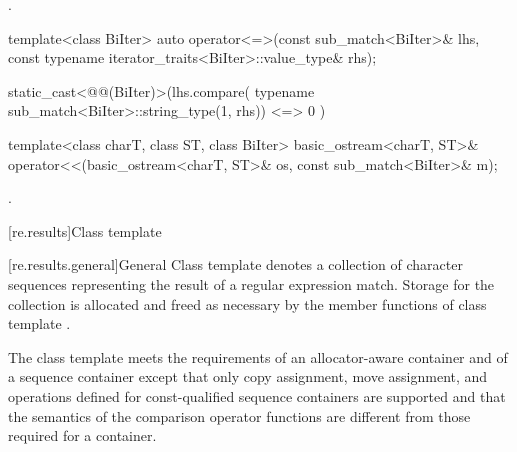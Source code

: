 \begin{itemdescr}
\pnum
\returns
{}.
\end{itemdescr}

%
\begin{itemdecl}
template<class BiIter>
  auto operator<=>(const sub_match<BiIter>& lhs,
                   const typename iterator_traits<BiIter>::value_type& rhs);
\end{itemdecl}

\begin{itemdescr}
\pnum
\returns
\begin{codeblock}
static_cast<@@(BiIter)>(lhs.compare(
  typename sub_match<BiIter>::string_type(1, rhs))
    <=> 0
  )
\end{codeblock}
\end{itemdescr}

%
%
\begin{itemdecl}
template<class charT, class ST, class BiIter>
  basic_ostream<charT, ST>&
    operator<<(basic_ostream<charT, ST>& os, const sub_match<BiIter>& m);
\end{itemdecl}

\begin{itemdescr}
\pnum
\returns
{}.
\end{itemdescr}

[re.results]{Class template }

[re.results.general]{General}
\pnum
{}%
Class template  denotes a collection of character
sequences representing the result of a regular expression
match. Storage for the collection is allocated and freed as necessary
by the member functions of class template .

\pnum
{}%
%
The class template  meets the requirements of an
allocator-aware container and of
a sequence container
except that only
copy assignment,
move assignment, and
operations defined for const-qualified sequence containers
are supported and
that the semantics of the comparison operator functions are different from those
required for a container.

